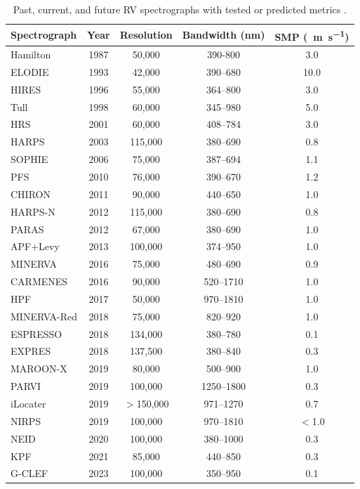 \begin{table}
    \centering
    \small
    \begin{tabular}{lcccc}
        \hline
        \hline
        Spectrograph & Year & Resolution & Bandwidth (nm) & SMP (~\si{\meter\per\second}) \\
        \hline
        Hamilton & 1987 & 50,000 & 390-800 & 3.0 \\
        ELODIE & 1993 & 42,000 & 390--680 & 10.0 \\
        HIRES & 1996 & 55,000 & 364--800 & 3.0\rightarrow1.5 \\
        Tull & 1998 & 60,000 & 345--980 & 5.0 \\
        HRS & 2001 & 60,000 & 408--784 & 3.0 \\
        \hline
        HARPS & 2003 & 115,000 & 380--690 & 0.8 \\
        SOPHIE & 2006 & 75,000 & 387--694 & 1.1 \\
        PFS & 2010 & 76,000 & 390--670 & 1.2 \\
        CHIRON & 2011 & 90,000 & 440--650 & 1.0 \\
        HARPS-N & 2012 & 115,000 & 380--690 & 0.8 \\
        PARAS & 2012 & 67,000 & 380--690 & 1.0 \\
        APF+Levy & 2013 & 100,000 & 374--950 & 1.0 \\
        \hline
        MINERVA & 2016 & 75,000 & 480--690 & 0.9 \\
        CARMENES & 2016 & 90,000 & 520--1710 & 1.0 \\
        HPF & 2017 & 50,000 & 970--1810 & 1.0 \\
        MINERVA-Red & 2018 & 75,000 & 820--920 & 1.0 \\
        ESPRESSO & 2018 & 134,000 & 380--780 & 0.1 \\
        EXPRES & 2018 & 137,500 & 380--840 & 0.3 \\
        MAROON-X & 2019 & 80,000 & 500--900 & 1.0 \\
        PARVI & 2019 & 100,000 & 1250--1800 & 0.3 \\
        iLocater & 2019 & $>$150,000 & 971--1270 & 0.7 \\
        NIRPS & 2019 & 100,000 & 970--1810 & $<$1.0 \\
        NEID & 2020 & 100,000 & 380--1000 & 0.3 \\
        KPF & 2021 & 85,000 & 440--850 & 0.3 \\
        G-CLEF & 2023 & 100,000 & 350--950 & 0.1 \\
        \hline
    \end{tabular}
    \caption[History of radial-velocity spectrographs]{Past, current, and future RV spectrographs with tested or predicted metrics \citep{fischer_state_2016, wright_third_2017}.}
    \label{tab:spectrographs}
\end{table}

